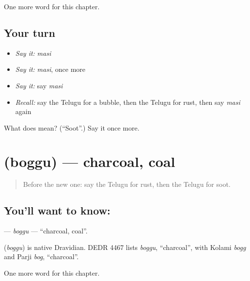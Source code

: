 \begin{grammarlens}[title={What you've built}]
One more word for this chapter.
\end{grammarlens}

\subsection*{Your turn}
\begin{itemize}
\raggedright
  \item \emph{Say it:} \emph{masi}
  \item \emph{Say it:} \emph{masi}, once more
  \item \emph{Say it:} say \emph{masi}
  \item \emph{Recall:} say the Telugu for a bubble, then the Telugu for rust, then say \emph{masi} again
\end{itemize}

\begin{tcolorbox}[breakable,colback=teal!4,colframe=teal!35!black,title={Before you move on}]
What does  mean? (\textquotedblleft{}Soot\textquotedblright{}.) Say it once more.
\end{tcolorbox}
\section[\texorpdfstring{\te{బొగ్గు} (boggu)}{బొగ్గు (boggu)}]{ (boggu) — charcoal, coal}

\label{lesson:TE-C233-boggu}



\begin{quote}
Before the new one: say the Telugu for rust, then the Telugu for soot.
\end{quote}

\subsection*{You'll want to know: }
\textbf{} — \emph{boggu} — \textquotedblleft{}charcoal, coal\textquotedblright{}.

\begin{cousinweb}
\textbf{} (\emph{boggu}) is native Dravidian. DEDR 4467 lists \emph{boggu}, \textquotedblleft{}charcoal\textquotedblright{}, with Kolami \emph{bogg} and Parji \emph{bog}, \textquotedblleft{}charcoal\textquotedblright{}.
\end{cousinweb}

\begin{grammarlens}[title={What you've built}]
One more word for this chapter.
\end{grammarlens}

